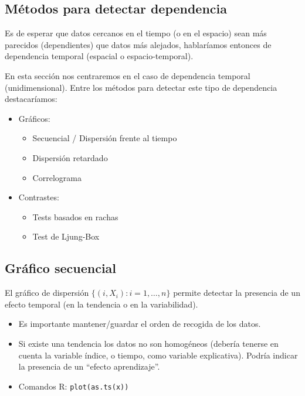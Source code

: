 \documentclass[
]{book}
\theoremstyle{break}
\theoremstyle{definition}
\theoremstyle{definition}
\theoremstyle{definition}
\theoremstyle{definition}
\theoremstyle{remark}
\begin{document}
\hypertarget{muxe9todos-para-detectar-dependencia}{%
\subsection{Métodos para detectar dependencia}\label{muxe9todos-para-detectar-dependencia}}

Es de esperar que datos cercanos en el tiempo (o en el espacio)
sean más parecidos (dependientes) que datos más alejados, hablaríamos entonces de dependencia temporal (espacial o espacio-temporal).

En esta sección nos centraremos en el caso de dependencia temporal (unidimensional).
Entre los métodos para detectar este tipo de dependencia destacaríamos:

\begin{itemize}
\item
  Gráficos:

  \begin{itemize}
  \item
    Secuencial / Dispersión frente al tiempo
  \item
    Dispersión retardado
  \item
    Correlograma
  \end{itemize}
\item
  Contrastes:

  \begin{itemize}
  \item
    Tests basados en rachas
  \item
    Test de Ljung-Box
  \end{itemize}
\end{itemize}

\hypertarget{gruxe1fico-secuencial}{%
\subsection{Gráfico secuencial}\label{gruxe1fico-secuencial}}

El gráfico de dispersión \(\{(i,X_{i}) : i = 1, \ldots, n \}\) permite detectar la presencia de un efecto temporal (en la tendencia o en la variabilidad).

\begin{itemize}
\item
  Es importante mantener/guardar el orden de recogida de los datos.
\item
  Si existe una tendencia los datos no son homogéneos (debería tenerse
  en cuenta la variable índice, o tiempo, como variable explicativa).
  Podría indicar la presencia de un ``efecto aprendizaje''.
\item
  Comandos R: \texttt{plot(as.ts(x))}
\end{itemize}
\end{document}
